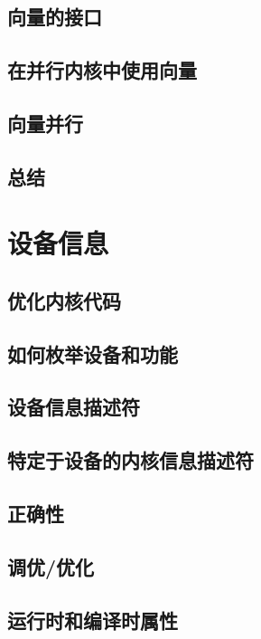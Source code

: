 \documentclass[11pt,a4paper,UTF8]{ctexart}
\begin{document}
		\subsection{向量的接口}
		
		\subsection{在并行内核中使用向量}
		
		\subsection{向量并行}
		
		\subsection{总结}
		
	\section{设备信息}
	
		\subsection{优化内核代码}
		
		\subsection{如何枚举设备和功能}
		
		\subsection{设备信息描述符}
		
		\subsection{特定于设备的内核信息描述符}
		
		\subsection{正确性}
		
		\subsection{调优/优化}
		
		\subsection{运行时和编译时属性}
		
\end{document}
